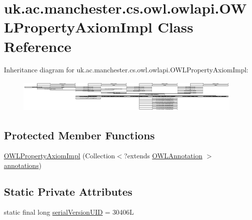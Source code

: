 \hypertarget{classuk_1_1ac_1_1manchester_1_1cs_1_1owl_1_1owlapi_1_1_o_w_l_property_axiom_impl}{\section{uk.\-ac.\-manchester.\-cs.\-owl.\-owlapi.\-O\-W\-L\-Property\-Axiom\-Impl Class Reference}
\label{classuk_1_1ac_1_1manchester_1_1cs_1_1owl_1_1owlapi_1_1_o_w_l_property_axiom_impl}
}
Inheritance diagram for uk.\-ac.\-manchester.\-cs.\-owl.\-owlapi.\-O\-W\-L\-Property\-Axiom\-Impl\-:\begin{figure}[H]
\begin{center}
\leavevmode
\includegraphics[height=1.674641cm]{classuk_1_1ac_1_1manchester_1_1cs_1_1owl_1_1owlapi_1_1_o_w_l_property_axiom_impl}
\end{center}
\end{figure}
\subsection*{Protected Member Functions}
\begin{DoxyCompactItemize}
\item 
\hyperlink{classuk_1_1ac_1_1manchester_1_1cs_1_1owl_1_1owlapi_1_1_o_w_l_property_axiom_impl_adbb75c47094fa75dcd2ec6476d1536d2}{O\-W\-L\-Property\-Axiom\-Impl} (Collection$<$?extends \hyperlink{interfaceorg_1_1semanticweb_1_1owlapi_1_1model_1_1_o_w_l_annotation}{O\-W\-L\-Annotation} $>$ \hyperlink{classuk_1_1ac_1_1manchester_1_1cs_1_1owl_1_1owlapi_1_1_o_w_l_axiom_impl_af6fbf6188f7bdcdc6bef5766feed695e}{annotations})
\end{DoxyCompactItemize}
\subsection*{Static Private Attributes}
\begin{DoxyCompactItemize}
\item 
static final long \hyperlink{classuk_1_1ac_1_1manchester_1_1cs_1_1owl_1_1owlapi_1_1_o_w_l_property_axiom_impl_a389151a1ddc73e44572459ea81e7614e}{serial\-Version\-U\-I\-D} = 30406\-L
\end{DoxyCompactItemize}
